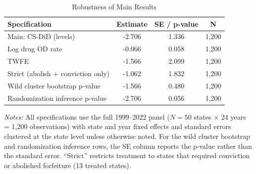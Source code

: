 \begin{table}[H]
\centering
\caption{Robustness of Main Results}
\label{tab:robustness}
\begin{tabular}{lccc}
\toprule
Specification & Estimate & SE / p-value & N \\
\midrule
Main: CS-DiD (levels) & -2.706 & 1.336 & 1,200 \\
Log drug OD rate & -0.066 & 0.058 & 1,200 \\
TWFE & -1.566 & 2.099 & 1,200 \\
Strict (abolish + conviction only) & -1.062 & 1.832 & 1,200 \\
Wild cluster bootstrap p-value & -1.566 & 0.480 & 1,200 \\
Randomization inference p-value & -2.706 & 0.056 & 1,200 \\
\bottomrule
\end{tabular}
\begin{tablenotes}[flushleft]
\small
\item \textit{Notes:} All specifications use the full 1999--2022 panel ($N = 50$ states $\times$ 24 years = 1,200 observations) with state and year fixed effects and standard errors clustered at the state level unless otherwise noted. For the wild cluster bootstrap and randomization inference rows, the SE column reports the p-value rather than the standard error. ``Strict'' restricts treatment to states that required conviction or abolished forfeiture (13 treated states).
\end{tablenotes}
\end{table}
